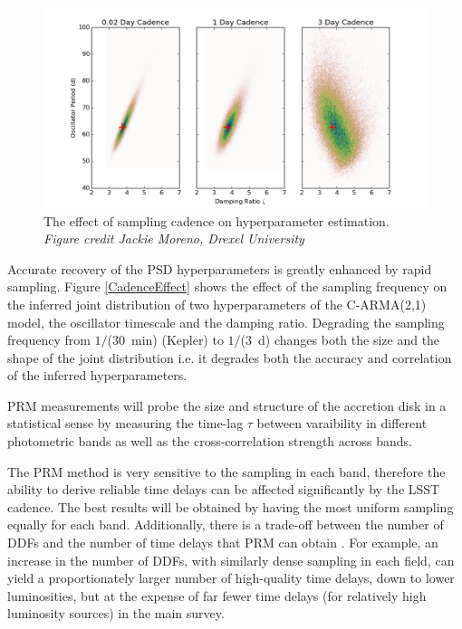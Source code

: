 \begin{figure}
\includegraphics[width=5.0in]{figs/agn/AGN_Variability_00.png}
\caption{The effect of sampling cadence on hyperparameter estimation. {\it {\scriptsize Figure credit
 Jackie Moreno, Drexel University}}}
\label{CadenceEffec}
\end{figure}

Accurate recovery of the PSD hyperparameters is greatly enhanced by rapid sampling. Figure \ref{CadenceEffect}
shows the effect of the sampling frequency on the inferred joint distribution of two
 hyperparameters of the C-ARMA(2,1) model, the 
oscillator timescale and the damping ratio. Degrading the sampling frequency from $1/$($30$~min) 
(Kepler) to $1/$($3$~d) changes both the size and the shape of the joint distribution i.e. it degrades both 
the accuracy and correlation of the inferred hyperparameters. 

PRM measurements will probe the size and structure of the
accretion disk in a statistical sense by measuring the time-lag 
$\tau$ between varaibility in different photometric bands as well as the 
cross-correlation strength across bands.  

The PRM method is very sensitive to the sampling in each band,
therefore the ability to derive reliable time delays can be affected
significantly by the LSST cadence. The best results will be obtained
by having the most uniform sampling equally for each band.
Additionally, there is a trade-off between the number of DDFs and the
number of time delays that PRM can obtain \citep{CheloucheEtal2014}.
For example, an increase in the number of DDFs, with similarly dense
sampling in each field, can yield a proportionately larger number of
high-quality time delays, down to lower luminosities, but at the
expense of far fewer time delays (for relatively high luminosity
sources) in the main survey.



